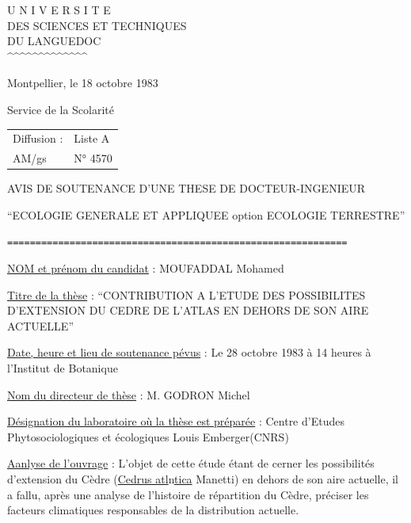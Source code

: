 
\noindent
\begin{minipage}[t]{0.44\linewidth}
\centering
U N I V E R S I T E\\
DES SCIENCES ET TECHNIQUES\\
DU LANGUEDOC\\
\textasciicircum\textasciicircum\textasciicircum\textasciicircum\textasciicircum\textasciicircum\textasciicircum\textasciicircum\textasciicircum\textasciicircum\textasciicircum\textasciicircum\textasciicircum
\end{minipage}\hfill
\begin{minipage}[t]{0.53\linewidth}
\raggedleft
\vspace{\baselineskip}
Montpellier, le 18 octobre 1983
\end{minipage}

Service de la Scolarité

\begin{tabular}{@{}ll@{}}
Diffusion : & Liste A\\
AM/gs & N° 4570
\end{tabular}

\begin{center}
AVIS DE SOUTENANCE D'UNE THESE DE DOCTEUR-INGENIEUR

``ECOLOGIE GENERALE ET APPLIQUEE option ECOLOGIE TERRESTRE''

\texttt{============================================================}
\end{center}

\uline{NOM et prénom du candidat} : MOUFADDAL Mohamed

\uline{Titre de la thèse} : ``CONTRIBUTION A L'ETUDE DES POSSIBILITES D'EXTENSION DU CEDRE DE L'ATLAS EN DEHORS DE SON AIRE ACTUELLE''

\uline{Date, heure et lieu de soutenance pévus} : Le 28 octobre 1983 à 14 heures à l'Institut de Botanique

\uline{Nom du directeur de thèse} : M. GODRON Michel

\uline{Désignation du laboratoire où la thèse est préparée} : Centre d'Etudes Phytosociologiques et écologiques Louis Emberger(CNRS)

\uline{Aanlyse de l'ouvrage} : L'objet de cette étude étant de cerner les possibilités d'extension du Cèdre (\uline{Cedrus atl}n\uline{tica} Manetti) en dehors de son aire actuelle, il a fallu, après une analyse de l'histoire de répartition du Cèdre, préciser les facteurs climatiques responsables de la distribution actuelle.

